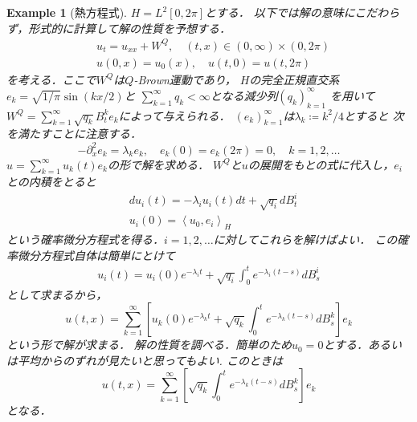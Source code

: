 \documentclass[dvipdfmx,autodetect-engine]{jsarticle}
\newtheorem{example}{Example}[section]
\theoremstyle{remark}
\theoremstyle{definition}
\newcommand{\paren}[1]{\left( #1 \right)}
\newcommand{\iprod}[1]{\left\langle #1 \right\rangle}
\begin{document}
\begin{example}[熱方程式]
    $H = L^{2}[0,2\pi]$とする．
    以下では解の意味にこだわらず，形式的に計算して解の性質を予想する．
    \begin{align}
        &u_{t} = u_{xx} + W^{Q},\quad (t,x) \in (0,\infty)\times (0,2\pi)\\
        &u(0,x) = u_{0}(x),\quad u(t,0)=u(t,2\pi)
    \end{align}
    を考える．ここで$W^{Q}$は$Q$-Brown運動であり，
    $H$の完全正規直交系$e_{k} = \sqrt{1/\pi} \sin{\paren{kx/2}}$と
    $\sum_{k=1}^{\infty} q_{k} <\infty$となる減少列$(q_{k})_{k=1}^{\infty}$
    を用いて$W^{Q} = \sum_{k=1}^{\infty} \sqrt{q_{k}} B_{t}^{k} e_{k}$によって与えられる．
    $(e_{k})_{k=1}^{\infty}$は$\lambda_{k} \coloneqq k^{2}/4$とすると
    次を満たすことに注意する．
    \begin{equation}
        -\partial_{x}^{2} e_{k} = \lambda_{k} e_{k},\quad e_{k}(0) = e_{k}(2\pi) = 0,\quad
        k=1,2,\ldots
    \end{equation}
    $u=\sum_{k=1}^{\infty} u_{k}(t) e_{k}$の形で解を求める．
    $W^{Q}$と$u$の展開をもとの式に代入し，$e_{i}$との内積をとると
    \begin{align}
        &du_{i}(t) = -\lambda_{i} u_{i}(t)dt + \sqrt{q_{i}} dB_{t}^{i}\\
        &u_{i}(0) = \iprod{u_{0},e_{i}}_{H}
    \end{align}
    という確率微分方程式を得る．$i=1,2,\ldots$に対してこれらを解けばよい．
    この確率微分方程式自体は簡単にとけて
    \begin{align}
        u_{i}(t) = u_{i}(0) e^{-\lambda_{i}t} + 
        \sqrt{q_{i}} \int_{0}^{t} e^{-\lambda_{i}(t-s)}dB_{s}^{i}
    \end{align}
    として求まるから，
    \begin{equation}
        u(t,x) = \sum_{k=1}^{\infty} 
        \left[
        u_{k}(0) e^{-\lambda_{k}t} + 
        \sqrt{q_{k}} \int_{0}^{t} e^{-\lambda_{k}(t-s)}dB_{s}^{k}
        \right]e_{k}
    \end{equation}
    という形で解が求まる．
    解の性質を調べる．簡単のため$u_{0}=0$とする．あるいは平均からのずれが見たいと思ってもよい.
    このときは
    \begin{equation}\label{heat_Ito_calculus}
        u(t,x) = \sum_{k=1}^{\infty} 
        \left[
        \sqrt{q_{k}} \int_{0}^{t} e^{-\lambda_{k}(t-s)}dB_{s}^{k}
        \right]e_{k}
    \end{equation}
    となる．
    \begin{align}

\end{align}
\end{example}
\end{document}
